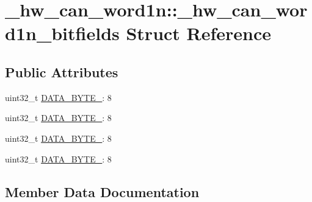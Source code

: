 \hypertarget{struct__hw__can__word1n_1_1__hw__can__word1n__bitfields}{}\section{\+\_\+hw\+\_\+can\+\_\+word1n\+:\+:\+\_\+hw\+\_\+can\+\_\+word1n\+\_\+bitfields Struct Reference}
\label{struct__hw__can__word1n_1_1__hw__can__word1n__bitfields}
\subsection*{Public Attributes}
\begin{DoxyCompactItemize}
\item 
uint32\+\_\+t \hyperlink{struct__hw__can__word1n_1_1__hw__can__word1n__bitfields_a49035321e2d64a6fee53c56a611de830}{D\+A\+T\+A\+\_\+\+B\+Y\+T\+E\+\_}\+: 8
\item 
uint32\+\_\+t \hyperlink{struct__hw__can__word1n_1_1__hw__can__word1n__bitfields_af7dc3f0293c09eb1f11f713586be093b}{D\+A\+T\+A\+\_\+\+B\+Y\+T\+E\+\_}\+: 8
\item 
uint32\+\_\+t \hyperlink{struct__hw__can__word1n_1_1__hw__can__word1n__bitfields_a7159506bec03630c25d1360d999be5e9}{D\+A\+T\+A\+\_\+\+B\+Y\+T\+E\+\_}\+: 8
\item 
uint32\+\_\+t \hyperlink{struct__hw__can__word1n_1_1__hw__can__word1n__bitfields_a66772774fa17bd05dff7fde2e46783fd}{D\+A\+T\+A\+\_\+\+B\+Y\+T\+E\+\_}\+: 8
\end{DoxyCompactItemize}


\subsection{Member Data Documentation}
